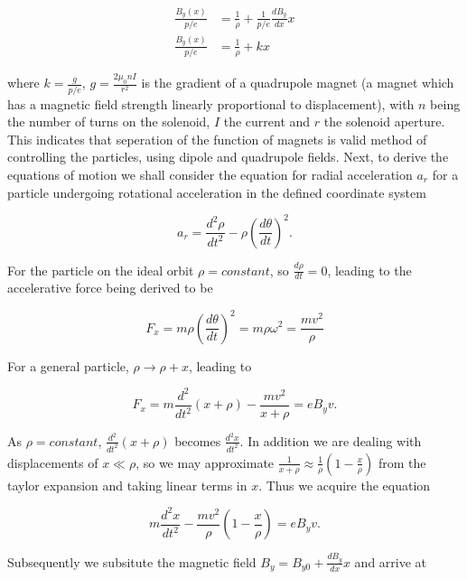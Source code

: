 \begin{align}
\frac{B_{y} \left( x \right)}{p/e} &= \frac{1}{\rho} + \frac{1}{p/e}\frac{dB_{y}}{dx} x \\
\frac{B_{y} \left( x \right)}{p/e} &= \frac{1}{\rho} + k x
\end{align}

where $k = \frac{g}{p/e}$, $g=\frac{2\mu_{0}nI}{r^{2}}$ is the gradient of a quadrupole magnet (a magnet which has a magnetic field strength linearly proportional to displacement), with $n$ being the number of turns on the solenoid, $I$ the current and $r$ the solenoid aperture. This indicates that seperation of the function of magnets is valid method of controlling the particles, using dipole and quadrupole fields. Next, to derive the equations of motion we shall consider the equation for radial acceleration $a_{r}$ for a particle undergoing rotational acceleration in the defined coordinate system

\begin{equation}
a_{r} = \frac{d^{2}\rho}{dt^{2}} - \rho \left( \frac{d\theta}{dt} \right)^{2}.
\end{equation}

For the particle on the ideal orbit $\rho = constant$, so $\frac{d \rho}{dt} = 0$, leading to the accelerative force being derived to be

\begin{equation}
F_{x} = m \rho \left( \frac{d\theta}{dt} \right)^{2} = m\rho \omega^{2} = \frac{mv^{2}}{\rho}
\end{equation} 

For a general particle, $\rho \rightarrow \rho + x$, leading to

\begin{equation}
F_{x} = m\frac{d^{2}}{dt^{2}} \left( x+ \rho \right) - \frac{mv^{2}}{x + \rho} = eB_{y} v.
\end{equation}

As $\rho = constant$, $\frac{d^{2}}{dt^{2}} ( x+ \rho )$ becomes $\frac{d^{2}x}{dt^{2}}$. In addition we are dealing with displacements of $x \ll \rho$, so we may approximate $\frac{1}{x+\rho} \approx \frac{1}{\rho}(1-\frac{x}{\rho})$ from the taylor expansion and taking linear terms in $x$. Thus we acquire the equation

\begin{equation}
 m\frac{d^{2}x}{dt^{2}}  - \frac{mv^{2}}{\rho}\left( 1 - \frac{x}{\rho} \right) = eB_{y} v.
\end{equation}

Subsequently we subsitute the magnetic field $B_{y} = B_{y0} + \frac{dB_{y}}{dx} x$ and arrive at

